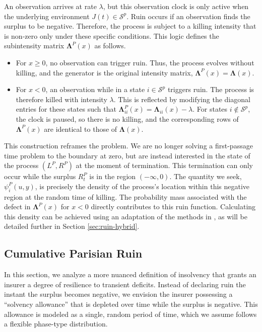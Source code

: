 \documentclass[11pt]{article}
\numberwithin{table}{section}
\numberwithin{figure}{section}
\numberwithin{equation}{section}
\newcommand{\1}{{\mathbf 1}}
\newcommand{\0}{\mat{0}}
\begin{document}
An observation arrives at rate \(\lambda\), but this observation clock is only active when the underlying environment \(J(t) \in \mathcal{S}^p\). Ruin occurs if an observation finds the surplus to be negative. Therefore, the process is subject to a killing intensity that is non-zero only under these specific conditions. This logic defines the subintensity matrix \(\bm{\Lambda}^P(x)\) as follows.
\begin{itemize}
    \item For \(x \ge 0\), no observation can trigger ruin. Thus, the process evolves without killing, and the generator is the original intensity matrix, \(\bm{\Lambda}^P(x) = \bm{\Lambda}(x)\).
    \item For \(x < 0\), an observation while in a state \(i \in \mathcal{S}^p\) triggers ruin. The process is therefore killed with intensity \(\lambda\). This is reflected by modifying the diagonal entries for these states such that \(\bm{\Lambda}^P_{ii}(x) = \bm{\Lambda}_{ii}(x) - \lambda\). For states \(i \notin \mathcal{S}^p\), the clock is paused, so there is no killing, and the corresponding rows of \(\bm{\Lambda}^P(x)\) are identical to those of \(\bm{\Lambda}(x)\).
\end{itemize}
This construction reframes the problem. We are no longer solving a first-passage time problem to the boundary at zero, but are instead interested in the state of the process \((L^P, R^P)\) at the moment of termination. This termination can only occur while the surplus \(R^P_t\) is in the region \((-\infty, 0)\). The quantity we seek, \(\psi_i^P(u, y)\), is precisely the density of the process's location within this negative region at the random time of killing. The probability mass associated with the defect in \(\bm{\Lambda}^P(x)\) for \(x<0\) directly contributes to this ruin function. Calculating this density can be achieved using an adaptation of the methods in \cite{albrecher2022space}, as will be detailed further in Section \ref{sec:ruin-hybrid}.

\subsection{Cumulative Parisian Ruin}
In this section, we analyze a more nuanced definition of insolvency that grants an insurer a degree of resilience to transient deficits. Instead of declaring ruin the instant the surplus becomes negative, we envision the insurer possessing a ``solvency allowance'' that is depleted over time while the surplus is negative. This allowance is modeled as a single, random period of time, which we assume follows a flexible phase-type distribution.
\end{document}
